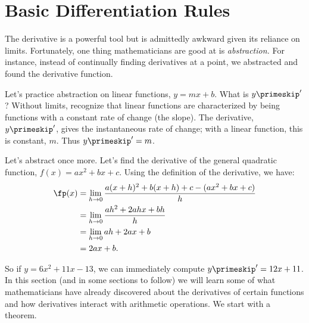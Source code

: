 \section{Basic Differentiation Rules}\label{sec:basic_diff_rules}

The derivative is a powerful tool but is admittedly awkward given its reliance on limits. Fortunately, one thing mathematicians are good at is \textit{abstraction.} For instance, instead of continually finding derivatives at a point, we abstracted and found the derivative function. 

Let's practice abstraction on linear functions, $y=mx+b$. What is $y\primeskip'$? Without limits, recognize that linear functions are characterized by being functions with a constant rate of change (the slope). The derivative, $y\primeskip'$, gives the instantaneous rate of change; with a linear function, this is constant, $m$. Thus $y\primeskip'=m$. 

Let's abstract once more. Let's find the derivative of the general quadratic function, $f(x) = ax^2+bx+c$. Using the definition of the derivative, we have:
		\begin{align*}
		\fp(x) 	&=	\lim_{h\to 0}\frac{a(x+h)^2+b(x+h)+c-(ax^2+bx+c)}{h} \\
						&=	\lim_{h\to 0} \frac{ah^2+2ahx+bh}{h} \\
						&=	\lim_{h\to 0} ah+2ax+b\\
						&= 2ax+b.
		\end{align*}
		
So if $y = 6x^2+11x-13$, we can immediately compute $y\primeskip' = 12x+11$. \\

In this section (and in some sections to follow) we will learn some of what mathematicians have already discovered about the derivatives of certain functions and how derivatives interact with arithmetic operations. We start with a theorem.

